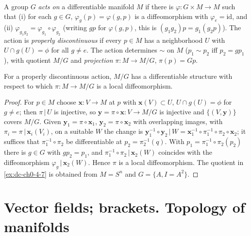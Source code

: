 \begin{example}
  \label{ex:dc-ch0-4-8}
  \notready
  A group $G$ \emph{acts on} a differentiable manifold $M$ if there is
  $\varphi:G\times M\to M$ such that (i) for each $g\in G$, $\varphi_g(p)=\varphi(g,p)$
  is a diffeomorphism with $\varphi_e=\mathrm{id}$, and (ii)
  $\varphi_{g_1 g_2}=\varphi_{g_1}\circ\varphi_{g_2}$ (writing $gp$ for $\varphi(g,p)$,
  this is $(g_1 g_2)p=g_1(g_2 p)$). The action is \emph{properly discontinuous} if every
  $p\in M$ has a neighborhood $U$ with $U\cap g(U)=\phi$ for all $g\neq e$. The
  action determines $\sim$ on $M$ ($p_1\sim p_2$ iff $p_2=gp_1$), with quotient
  $M/G$ and \emph{projection} $\pi:M\to M/G$, $\pi(p)=Gp$.
  
  For a properly discontinuous action, $M/G$ has a differentiable structure with
  respect to which $\pi:M\to M/G$ is a local diffeomorphism.
\end{example}
\begin{proof}
  \sketch
  For $p\in M$ choose $\mathbf{x}:V\to M$ at $p$ with $\mathbf{x}(V)\subset
  U$, $U\cap g(U)=\phi$ for $g\neq e$; then $\pi\,|\,U$ is injective, so
  $\mathbf{y}=\pi\circ\mathbf{x}:V\to M/G$ is injective and $\{(V,\mathbf{y})\}$
  covers $M/G$. Given $\mathbf{y}_1=\pi\circ\mathbf{x}_1$,
  $\mathbf{y}_2=\pi\circ\mathbf{x}_2$ with overlapping images, with $\pi_i=\pi\,|\,\mathbf{x}_i(V_i)$,
  on a suitable $W$ the change is
  $\mathbf{y}_1^{-1}\circ\mathbf{y}_2\,|\,W=\mathbf{x}_1^{-1}\circ\pi_1^{-1}\circ\pi_2\circ\mathbf{x}_2$;
  it suffices that $\pi_1^{-1}\circ\pi_2$ be differentiable at
  $p_2=\pi_2^{-1}(q)$. With $p_1=\pi_1^{-1}\circ\pi_2(p_2)$ there is $g\in G$ with
  $gp_2=p_1$, and $\pi_1^{-1}\circ\pi_2\,|\,\mathbf{x}_2(W)$ coincides with the
  diffeomorphism $\varphi_g\,|\,\mathbf{x}_2(W)$. Hence $\pi$ is a local
  diffeomorphism. The quotient in \cref{ex:dc-ch0-4-7} is obtained from
  $M=S^n$ and $G=\{A,I=A^2\}$.
\end{proof}

\section{Vector fields; brackets. Topology of manifolds}

